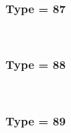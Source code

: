 \documentclass{article}
\begin{document}
            \\
        
        
        
            \subsubsection*{Type = 87}    
            
            \\
        
        
        
            \subsubsection*{Type = 88}    
            
            \\
        
        
        
            \subsubsection*{Type = 89}    
            
            \\
        
    
\end{document}
